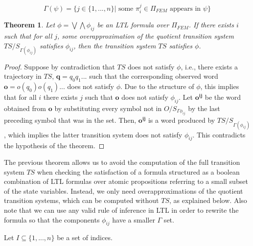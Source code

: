 \documentclass{article}
\newtheorem{theorem}{Theorem}
\begin{document}
\begin{equation}
    \Gamma(\psi) = \{j \in \{1,...,n\}| \text{ some }\pi_i^j \in \Pi_{FEM} \text{ appears in } \psi\}
\end{equation}


\begin{theorem}

Let $\phi = \bigvee \bigwedge \phi_{ij}$ be an LTL formula over $\Pi_{FEM}$. If
there exists $i$ such that for all $j$, some overapproximation of the quotient transition system
$TS/S_{\Gamma(\phi_{ij})}$ satisfies $\phi_{ij}$, then the transition system $TS$
satisfies $\phi$.
    
\end{theorem}

\begin{proof}

Suppose by contradiction that $TS$ does not satisfy $\phi$, i.e., there exists a
trajectory in $TS$, $\mathbf{q} = q_0 q_1...$ such that the corresponding observed
word $\mathbf{o} = o(q_0) o(q_1)...$ does not satisfy $\phi$. Due to the structure
of $\phi$, this implies that for all $i$ there exists $j$ such that $\mathbf{o}$ does
not satisfy $\phi_{ij}$. Let $\mathbf{o^{ij}}$ be the word obtained from
$\mathbf{o}$ by substituting every symbol not in $O/S_{\Gamma{\phi_{ij}}}$ by
the last preceding symbol that was in the set. Then, $\mathbf{o^{ij}}$ is a word
produced by $TS/S_{\Gamma(\phi_{ij})}$, which implies the latter transition system
does not satisfy $\phi_{ij}$. This contradicts the hypothesis of the
theorem.
    
\end{proof}

The previous theorem allows us to avoid the computation of the full transition
system $TS$ when checking the satisfaction of a formula structured as a boolean
combination of LTL formulas over atomic propositions referring to a small subset
of the state variables. Instead, we only need overapproximations of the quotient
transition systems, which can be computed without $TS$, as explained below. Also
note that we can use any valid rule of inference in LTL in order to rewrite the
formula so that the components $\phi_{ij}$ have a smaller $\Gamma$ set.

Let $I \subseteq \{1,...,n\}$ be a set of indices. 
\end{document}
